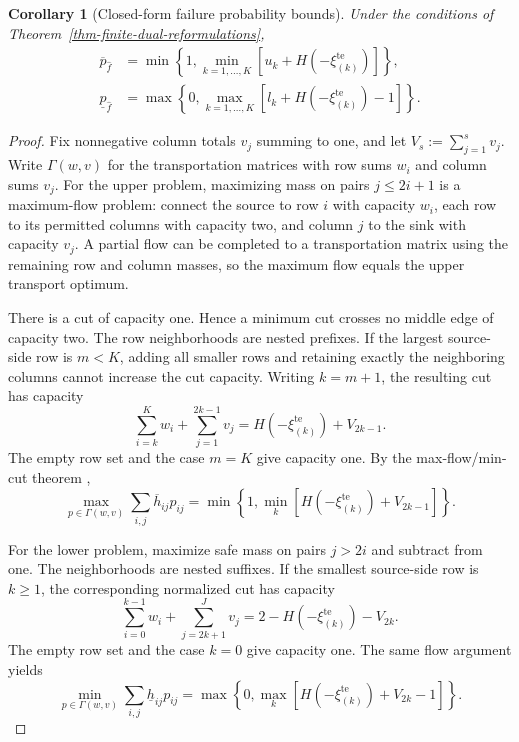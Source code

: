 \documentclass[review,11pt,3p,authoryear,nopreprintline]{elsarticle}
\newtheorem{corollary}{Corollary}
\begin{document}
\begin{corollary}[Closed-form failure probability bounds]
  \label{thm-closed-form-bounds}
  Under the conditions of Theorem~\ref{thm-finite-dual-reformulations},
  \begin{align}
    \overline p_{\hat f}
    &=\min\left\{1,\min_{k=1,\ldots,K}[u_k+H\left(-\xi_{(k)}^{\mathrm{te}}\right)]\right\},
    \label{eq-dw-closed-upper}\\
    \underline p_{\hat f}
    &=\max\left\{0,\max_{k=1,\ldots,K}[l_k+H\left(-\xi_{(k)}^{\mathrm{te}}\right)-1]\right\}.
    \label{eq-dw-closed-lower}
  \end{align}
\end{corollary}
\begin{proof}
  Fix nonnegative column totals $v_j$ summing to one, and let $V_s:=\sum_{j=1}^s v_j$. Write $\Gamma(w,v)$ for the transportation matrices with row sums $w_i$ and column sums $v_j$. For the upper problem, maximizing mass on pairs $j\le2i+1$ is a maximum-flow problem: connect the source to row $i$ with capacity $w_i$, each row to its permitted columns with capacity two, and column $j$ to the sink with capacity $v_j$. A partial flow can be completed to a transportation matrix using the remaining row and column masses, so the maximum flow equals the upper transport optimum.

  There is a cut of capacity one. Hence a minimum cut crosses no middle edge of capacity two. The row neighborhoods are nested prefixes. If the largest source-side row is $m<K$, adding all smaller rows and retaining exactly the neighboring columns cannot increase the cut capacity. Writing $k=m+1$, the resulting cut has capacity
  \[
    \sum_{i=k}^K w_i+\sum_{j=1}^{2k-1}v_j
    =H\left(-\xi_{(k)}^{\mathrm{te}}\right)+V_{2k-1}.
  \]
  The empty row set and the case $m=K$ give capacity one. By the max-flow/min-cut theorem \citep{F.F56},
  \begin{equation}
    \max_{p\in\Gamma(w,v)}
      \sum_{i,j}\overline h_{ij}p_{ij}
    =\min\left\{1,\min_k[H\left(-\xi_{(k)}^{\mathrm{te}}\right)+V_{2k-1}]\right\}.
    \label{eq-fixed-column-upper}
  \end{equation}

  For the lower problem, maximize safe mass on pairs $j>2i$ and subtract from one. The neighborhoods are nested suffixes. If the smallest source-side row is $k\ge1$, the corresponding normalized cut has capacity
  \[
    \sum_{i=0}^{k-1}w_i+\sum_{j=2k+1}^Jv_j
    =2-H\left(-\xi_{(k)}^{\mathrm{te}}\right)-V_{2k}.
  \]
  The empty row set and the case $k=0$ give capacity one. The same flow argument yields
  \begin{equation}
    \min_{p\in\Gamma(w,v)}
      \sum_{i,j}\underline h_{ij}p_{ij}
    =\max\left\{0,\max_k[H\left(-\xi_{(k)}^{\mathrm{te}}\right)+V_{2k}-1]\right\}.
    \label{eq-fixed-column-lower}
  \end{equation}


\end{proof}
\end{document}
